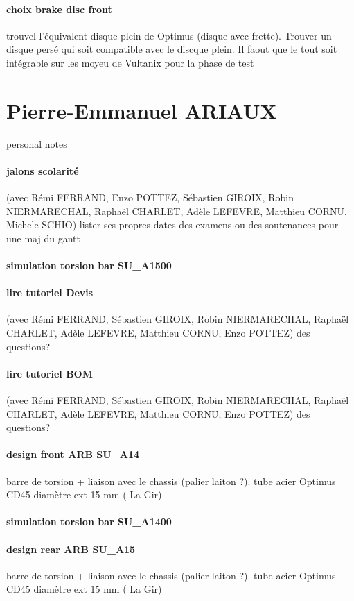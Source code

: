 \paragraph{choix brake disc front} trouvel l'équivalent disque plein de Optimus (disque avec frette). Trouver un disque persé qui soit compatible avec le discque plein. Il faout que le tout soit intégrable sur les moyeu de Vultanix pour la phase de test

 
 \newpage \section*{Pierre-Emmanuel ARIAUX} 
 \par personal notes
\paragraph{jalons scolarité} (avec Rémi FERRAND, Enzo POTTEZ, Sébastien GIROIX, Robin NIERMARECHAL, Raphaël CHARLET, Adèle LEFEVRE, Matthieu CORNU, Michele SCHIO) lister ses propres dates des examens ou des soutenances pour une maj du gantt
\paragraph{simulation torsion bar SU\_A1500} 
\paragraph{lire tutoriel Devis} (avec Rémi FERRAND, Sébastien GIROIX, Robin NIERMARECHAL, Raphaël CHARLET, Adèle LEFEVRE, Matthieu CORNU, Enzo POTTEZ) des questions?
\paragraph{lire tutoriel BOM} (avec Rémi FERRAND, Sébastien GIROIX, Robin NIERMARECHAL, Raphaël CHARLET, Adèle LEFEVRE, Matthieu CORNU, Enzo POTTEZ) des questions?
\paragraph{design front ARB SU\_A14} barre de torsion + liaison avec le chassis (palier laiton ?). tube acier Optimus CD45 diamètre ext 15 mm ( La Gir)
\paragraph{simulation torsion bar SU\_A1400} 
\paragraph{design rear ARB SU\_A15} barre de torsion + liaison avec le chassis (palier laiton ?). tube acier Optimus CD45 diamètre ext 15 mm ( La Gir)

